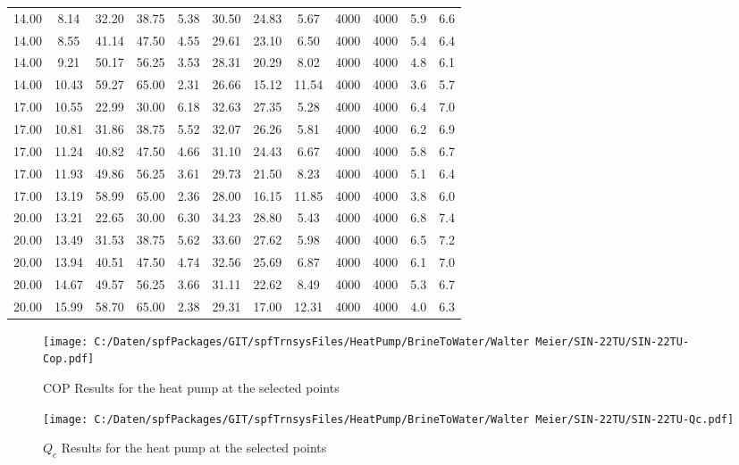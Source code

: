 \documentclass[english]{SPFShortReport}
\begin{document}
\begin{table}[!ht]
\begin{small}
\begin{center}
{\begin{tabular}{l | c c c c c c c c c c c }
14.00 & 8.14 & 32.20 & 38.75 & 5.38 & 30.50 & 24.83 & 5.67 & 4000 & 4000 & 5.9 & 6.6\\ 
14.00 & 8.55 & 41.14 & 47.50 & 4.55 & 29.61 & 23.10 & 6.50 & 4000 & 4000 & 5.4 & 6.4\\ 
14.00 & 9.21 & 50.17 & 56.25 & 3.53 & 28.31 & 20.29 & 8.02 & 4000 & 4000 & 4.8 & 6.1\\ 
14.00 & 10.43 & 59.27 & 65.00 & 2.31 & 26.66 & 15.12 & 11.54 & 4000 & 4000 & 3.6 & 5.7\\ 
17.00 & 10.55 & 22.99 & 30.00 & 6.18 & 32.63 & 27.35 & 5.28 & 4000 & 4000 & 6.4 & 7.0\\ 
17.00 & 10.81 & 31.86 & 38.75 & 5.52 & 32.07 & 26.26 & 5.81 & 4000 & 4000 & 6.2 & 6.9\\ 
17.00 & 11.24 & 40.82 & 47.50 & 4.66 & 31.10 & 24.43 & 6.67 & 4000 & 4000 & 5.8 & 6.7\\ 
17.00 & 11.93 & 49.86 & 56.25 & 3.61 & 29.73 & 21.50 & 8.23 & 4000 & 4000 & 5.1 & 6.4\\ 
17.00 & 13.19 & 58.99 & 65.00 & 2.36 & 28.00 & 16.15 & 11.85 & 4000 & 4000 & 3.8 & 6.0\\ 
20.00 & 13.21 & 22.65 & 30.00 & 6.30 & 34.23 & 28.80 & 5.43 & 4000 & 4000 & 6.8 & 7.4\\ 
20.00 & 13.49 & 31.53 & 38.75 & 5.62 & 33.60 & 27.62 & 5.98 & 4000 & 4000 & 6.5 & 7.2\\ 
20.00 & 13.94 & 40.51 & 47.50 & 4.74 & 32.56 & 25.69 & 6.87 & 4000 & 4000 & 6.1 & 7.0\\ 
20.00 & 14.67 & 49.57 & 56.25 & 3.66 & 31.11 & 22.62 & 8.49 & 4000 & 4000 & 5.3 & 6.7\\ 
20.00 & 15.99 & 58.70 & 65.00 & 2.38 & 29.31 & 17.00 & 12.31 & 4000 & 4000 & 4.0 & 6.3\\ 
\hline
\hline
\end{tabular}
}
\label{ResultsTable}
\end{center}
\end{small}
\end{table}
\begin{figure}[!ht]
\begin{center}
\texttt{[image: C:/Daten/spfPackages/GIT/spfTrnsysFiles/HeatPump/BrineToWater/Walter Meier/SIN-22TU/SIN-22TU-Cop.pdf]}
\caption{COP Results for the heat pump at the selected points}
\label{COPFig}
\end{center}
\end{figure}
\begin{figure}[!ht]
\begin{center}
\texttt{[image: C:/Daten/spfPackages/GIT/spfTrnsysFiles/HeatPump/BrineToWater/Walter Meier/SIN-22TU/SIN-22TU-Qc.pdf]}
\caption{$Q_c$ Results for the heat pump at the selected points}
\label{QcFig}
\end{center}
\end{figure}
\end{document}
